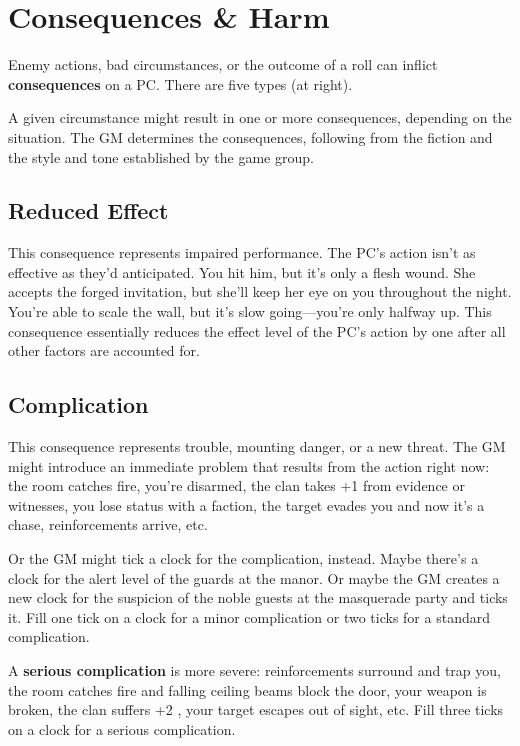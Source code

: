 \section{Consequences \& Harm}


Enemy actions, bad circumstances, or the outcome of a roll can inflict \textbf{consequences} on a PC. There are five types (at right).

A given circumstance might result in one or more consequences, depending on the situation. The GM determines the consequences, following from the fiction and the style and tone established by the game group.

\subsection{Reduced Effect}

This consequence represents impaired performance. The PC’s action isn’t as effective as they’d anticipated. You hit him, but it’s only a flesh wound. She accepts the forged invitation, but she’ll keep her eye on you throughout the night. You’re able to scale the wall, but it’s slow going—you’re only halfway up. This consequence essentially reduces the effect level of the PC’s action by one after all other factors are accounted for.

\subsection{Complication}

This consequence represents trouble, mounting danger, or a new threat. The GM might introduce an immediate problem that results from the action right now: the room catches fire, you’re disarmed, the clan takes +1  from evidence or witnesses, you lose status with a faction, the target evades you and now it’s a chase, reinforcements arrive, etc.

Or the GM might tick a clock for the complication, instead. Maybe there’s a clock for the alert level of the guards at the manor. Or maybe the GM creates a new clock for the suspicion of the noble guests at the masquerade party and ticks it. Fill one tick on a clock for a minor complication or two ticks for a standard complication.

A \textbf{serious complication} is more severe: reinforcements surround and trap you, the room catches fire and falling ceiling beams block the door, your weapon is broken, the clan suffers +2 , your target escapes out of sight, etc. Fill three ticks on a clock for a serious complication.

